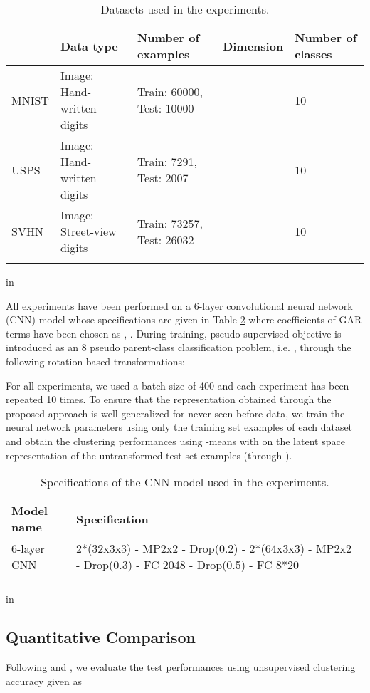 \documentclass{article} \usepackage{iclr2018_conference,times}
\newcommand{\ra}[1]{\renewcommand{\arraystretch}{#1}}
\begin{document}
\begin{table}[h]\centering
\ra{1.2}
\caption{Datasets used in the experiments.}
\resizebox{\columnwidth}{!} {
\begin{tabular}{@{}lllll@{}}\toprule
		& Data type 				& Number of examples 			& Dimension 				& Number of classes \\
\midrule
MNIST 	&Image: Hand-written digits & Train: 60000, Test: 10000		& 		& 10				\\
USPS 	&Image: Hand-written digits & Train: 7291, Test: 2007		& 		& 10				\\
SVHN	&Image: Street-view digits 	& Train: 73257, Test: 26032 	& 		& 10				\\
\bottomrule
\label{tab:pseudo_datasets}
\end{tabular}
}
 in
\end{table}

All experiments have been performed on a 6-layer convolutional neural network (CNN) model whose specifications are given in Table \ref{tab:pseudo_models} where coefficients of GAR terms have been chosen as , . During training, pseudo supervised objective is introduced as an 8 pseudo parent-class classification problem, i.e. , through the following rotation-based transformations:

For all experiments, we used a batch size of 400 and each experiment has been repeated 10 times. To ensure that the representation obtained through the proposed approach is well-generalized for never-seen-before data, we train the neural network parameters using only the training set examples of each dataset and obtain the clustering performances using -means with  on the latent space representation  of the untransformed test set examples (through ).
\begin{table}[h]\centering
\ra{1.2}
\caption{Specifications of the CNN model used in the experiments.}
\resizebox{\columnwidth}{!} {
\begin{tabular}{@{}ll@{}}\toprule
Model name & Specification\\
\midrule
6-layer CNN & 2*(32x3x3) - MP2x2 - Drop(0.2) - 2*(64x3x3) - MP2x2 - Drop(0.3) - FC 2048 - Drop(0.5) - FC 8*20 \\	
\bottomrule
\label{tab:pseudo_models}
\end{tabular}
}
 in
\end{table}

\subsection{Quantitative Comparison}
Following \citet{JiangZTTZ17} and \citet{YangPB16}, we evaluate the test performances using unsupervised clustering accuracy given as
\end{document}
